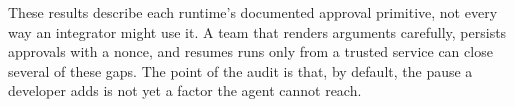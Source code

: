 These results describe each runtime's documented approval primitive, not every way an integrator might use it. A
team that renders arguments carefully, persists approvals with a nonce, and resumes runs only from a trusted
service can close several of these gaps. The point of the audit is that, by default, the pause a developer adds
is not yet a factor the agent cannot reach.
